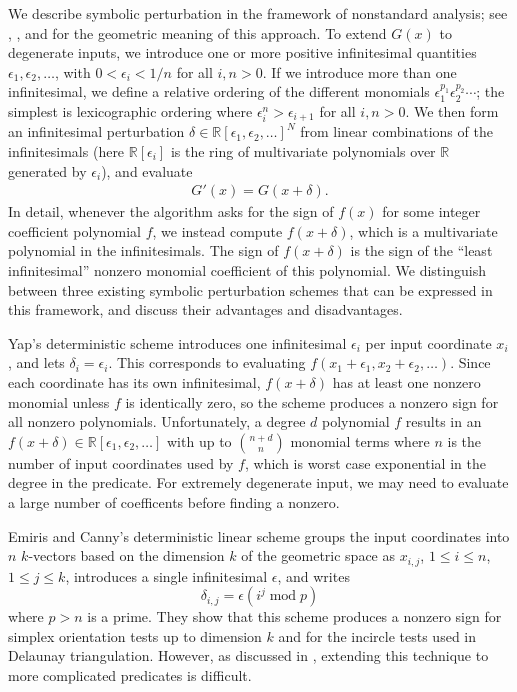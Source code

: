 \documentclass[11pt]{article}
\newcommand{\R}{\mathbb{R}}
\begin{document}
We describe symbolic perturbation in the framework of nonstandard analysis; see \cite{yap1990symbolic}, \cite{emiris1995general},
and \cite{seidel1998nature} for the geometric meaning of this approach.  To extend $G(x)$ to degenerate inputs, we introduce one
or more positive infinitesimal quantities $\epsilon_1, \epsilon_2, \ldots$, with $0 < \epsilon_i < 1/n$ for all $i,n > 0$.  If
we introduce more than one infinitesimal, we define a relative ordering of the different monomials $\epsilon_1^{p_1} \epsilon_2^{p_2} \cdots$;
the simplest is lexicographic ordering where $\epsilon_i^n > \epsilon_{i+1}$ for all $i,n > 0$.
We then form an infinitesimal perturbation $\delta \in \R[\epsilon_1,\epsilon_2, \ldots]^N$ from
linear combinations of the infinitesimals (here $\R[\epsilon_i]$ is the ring of multivariate polynomials over $\R$ generated by $\epsilon_i$), and evaluate
\begin{align*}
G'(x) = G(x+\delta).
\end{align*}
In detail, whenever the algorithm asks for the sign of $f(x)$ for some integer coefficient polynomial $f$, we instead compute
$f(x+\delta)$, which is a multivariate polynomial in the infinitesimals.  The sign of $f(x+\delta)$ is the sign of the ``least infinitesimal''
nonzero monomial coefficient of this polynomial.
We distinguish between three existing symbolic perturbation schemes that can be expressed in this framework, and discuss their advantages
and disadvantages.

Yap's deterministic scheme \cite{yap1990symbolic} introduces one infinitesimal $\epsilon_i$ per input coordinate $x_i$, and lets $\delta_i = \epsilon_i$.  This
corresponds to evaluating $f(x_1+\epsilon_1, x_2+\epsilon_2, \ldots)$.  Since each coordinate has its own infinitesimal, $f(x+\delta)$ has at least
one nonzero monomial unless $f$ is identically zero, so the scheme produces a nonzero sign for all nonzero polynomials.  Unfortunately, a degree $d$ polynomial
$f$ results in an $f(x+\delta) \in \R[\epsilon_1,\epsilon_2, \ldots]$ with up to $\binom{n + d}{n}$ monomial terms where $n$ is the number of input
coordinates used by $f$, which is worst case exponential in the degree in the predicate.  For extremely degenerate input, we may need to evaluate a large
number of coefficents before finding a nonzero.

Emiris and Canny's deterministic linear scheme \cite{emiris1992efficient} groups the input coordinates into $n$ $k$-vectors based on the dimension
$k$ of the geometric space as $x_{i,j}$, $1 \le i \le n$, $1 \le j \le k$, introduces a single infinitesimal $\epsilon$, and writes
$$\delta_{i,j} = \epsilon (i^j \operatorname{mod} p)$$
where $p > n$ is a prime.  They show that this scheme produces a nonzero sign for simplex orientation tests up to dimension $k$ and for
the incircle tests used in Delaunay triangulation.  However, as discussed in \cite{seidel1998nature}, extending this technique to more complicated predicates
is difficult.
\end{document}
